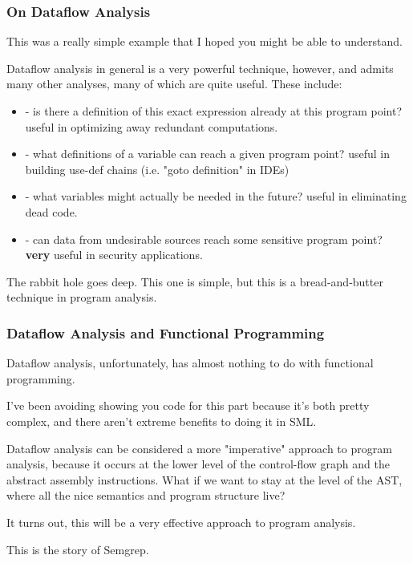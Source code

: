 \documentclass[aspectratio=169, handout]{beamer}
\begin{document}
\begin{frame}[fragile]
  \frametitle{On Dataflow Analysis}

  This was a really simple example that I hoped you might be able to understand.

  \pause
  \vspace{\fill}

  Dataflow analysis in general is a very powerful technique, however, and admits
  many other analyses, many of which are quite useful. These include:
  \pause
  \begin{itemize}
    \item {} - is there a definition of this exact
    expression already at this program point? useful in optimizing away
    redundant computations. \pause
    \item {} - what definitions of a variable can
    reach a given program point? useful in building use-def chains (i.e.
    "goto definition" in IDEs) \pause
    \item {} - what variables might actually be needed
    in the future? useful in eliminating dead code. \pause
    \item {} - can data from undesirable sources reach
    some sensitive program point? \textbf{very} useful in security applications.
  \end{itemize}

  \pause
  \vspace{\fill}

  The rabbit hole goes deep. This one is simple, but this is a bread-and-butter
  technique in program analysis.
\end{frame}

\begin{frame}[fragile]
  \frametitle{Dataflow Analysis and Functional Programming}

  Dataflow analysis, unfortunately, has almost nothing to do with functional
  programming.

  \pause
  \vspace{\fill}

  I've been avoiding showing you code for this part because it's both pretty
  complex, and there aren't extreme benefits to doing it in SML.

  \pause
  \vspace{\fill}

  Dataflow analysis can be considered a more "imperative" approach to
  program analysis, because it occurs at the lower level of the control-flow
  graph and the abstract assembly instructions. What if we want to stay at
  the level of the AST, where all the nice semantics and program structure live?

  \pause
  \vspace{\fill}

  It turns out, this will be a very effective approach to program analysis.

  \pause
  \vspace{\fill}

  This is the story of Semgrep.
\end{frame}
\end{document}
